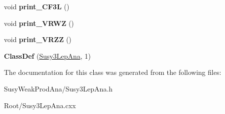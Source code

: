 \begin{DoxyCompactItemize}
\item 
\hypertarget{classSusy3LepAna_afced64a093df64665e591616388c40f4}{
void {\bfseries print\_\-CF3L} ()}
\label{classSusy3LepAna_afced64a093df64665e591616388c40f4}

\item 
\hypertarget{classSusy3LepAna_a257c6f378c2ba37fc0f5c06e8f2042e8}{
void {\bfseries print\_\-VRWZ} ()}
\label{classSusy3LepAna_a257c6f378c2ba37fc0f5c06e8f2042e8}

\item 
\hypertarget{classSusy3LepAna_a9b928e56d8c0e8574562296cb0eac387}{
void {\bfseries print\_\-VRZZ} ()}
\label{classSusy3LepAna_a9b928e56d8c0e8574562296cb0eac387}

\item 
\hypertarget{classSusy3LepAna_a5be9542d641e88e6848eef3732572b05}{
{\bfseries ClassDef} (\hyperlink{classSusy3LepAna}{Susy3LepAna}, 1)}
\label{classSusy3LepAna_a5be9542d641e88e6848eef3732572b05}

\end{DoxyCompactItemize}


The documentation for this class was generated from the following files:\begin{DoxyCompactItemize}
\item 
SusyWeakProdAna/Susy3LepAna.h\item 
Root/Susy3LepAna.cxx\end{DoxyCompactItemize}
